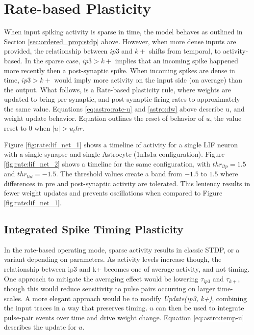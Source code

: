     \section{Rate-based Plasticity}

    When input spiking activity is sparse in time, the model behaves as outlined
    in Section \ref{sec:ordered_prop:stdp} above. However, when more dense
    inputs are provided, the relationship between $ip3$ and $k+$ shifts from
    temporal, to activity-based. In the sparse case, $ip3 > k+$ implies that an
    incoming spike happened more recently then a post-synaptic spike. When
    incoming spikes are dense in time, $ip3 > k+$ would imply more activity on
    the input side (on average) than the output. What follows, is a Rate-based
    plasticity rule, where weights are updated to bring pre-synaptic, and
    post-synaptic firing rates to approximately the same value. Equations
    \ref{eq:astro:rate-u} and \ref{astro:dw} above describe u, and
    weight update behavior. Equation \label{eq:astro:u-reset} outlines the reset
    of behavior of $u$, the value reset to $0$ when $|u| > u_thr$.

    Figure \ref{fig:rate:lif_net_1} shows a timeline of activity for a single
    LIF neuron with a single synapse and single Astrocyte (1n1s1a
    configuration). Figure \ref{fig:rate:lif_net_2} shows a timeline for the
    same configuration, with $thr_{ltp}=1.5$ and $thr_{ltd}=-1.5$. The threshold
    values create a band from $-1.5$ to $1.5$ where differences in pre and
    post-synaptic activity are tolerated. This leniency results in fewer weight
    updates and prevents oscillations when compared to Figure
    \ref{fig:rate:lif_net_1}.

    
    
 
    \subsection{Integrated Spike Timing Plasticity} \label{section:istp}
    
    In the rate-based operating mode, sparse activity results in classic STDP,
    or a variant depending on parameters. As activity levels increase though,
    the relationship between ip3 and k+ becomes one of average activity, and not
    timing. One approach to mitigate the averaging effect would be lowering
    $\tau_{ip3}$ and $\tau_{k+}$, though this would reduce sensitivity to pulse
    pairs occurring on larger time-scales. A more elegant approach would be to
    modify \emph{Update(ip3, k+)}, combining the input traces in a way that
    preserves timing. $u$ can then be used to integrate pulse-pair events over
    time and drive weight change. Equation \ref{eq:astro:temp-u} describes the
    update for $u$.

